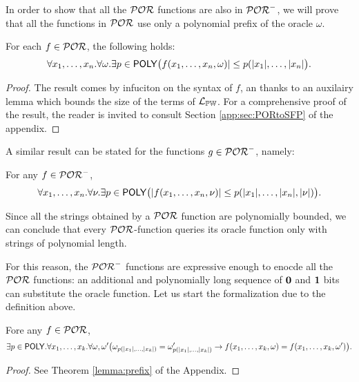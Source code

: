 In order to show that all the $\mathcal{POR}$ functions are also in $\mathcal{POR}^-$, we will prove
that all the functions in $\mathcal{POR}$ use only a polynomial prefix of the oracle $\omega$.

\begin{lemma}\label{main:SFPlemma9}
{For each $f\in \mathcal{POR}$, the following holds:
$$
\forall x_1,\dots,x_n.\forall \omega.\exists p\in \mathsf{POLY}
\big(f(x_1,\dots, x_n,\omega)| \leq p(|x_1|,\dots, |x_n|\big).
$$}
\end{lemma}
\begin{proof}
The result comes by infuciton on the syntax of $f$, an thanks to an auxilairy lemma which bounds the size of the terms of $\mathcal{L}_{\mathbb{PW}}$. For a comprehensive proof of the result, the reader is invited to consult Section \ref{app:sec:PORtoSFP} of the appendix.
\end{proof}

A similar result can be stated for the functions $g \in \mathcal{POR}^-$, namely:

\begin{lemma}
For any $f\in \mathcal{POR}^-$,
$$
\forall x_1,\dots, x_n.\forall \nu.\exists p\in \mathsf{POLY}
\big(|f(x_1,\dots, x_n,\nu)| \leq p(|x_1|,\dots, |x_n|, |\nu|)\big).
$$
\end{lemma}

Since all the strings obtained by a $\mathcal{POR}$ function
are polynomially bounded, we can conclude that every
$\mathcal{POR}$-function queries its
oracle function only with
strings of polynomial length.

For this reason, the $\mathcal{POR}^-$ functions are expressive enough
to enocde all the $\mathcal{POR}$ functions: an additional and polynomially
long sequence of {$\mathbf{0}$} and
{$\mathbf{1}$} bits can substitute the oracle function.
Let us start the formalization
due to the definition above.

\begin{lemma}[Prefix] \label{main:lemma:prefix}
Fore any $f\in \mathcal{POR}$,
\footnotesize
$$
\exists p \in \mathsf{POLY}. \forall x_1,\dots, x_k.
\forall \omega, \omega'\big(
\omega_{p(|x_1|,\dots, |x_k|)}=
\omega'_{p(|x_1|,\dots, |x_k|)}
\rightarrow f(x_1,\dots, x_k,\omega)
=f(x_1,\dots, x_k,\omega')\big).
$$
\end{lemma}
\begin{proof}
See Theorem \ref{lemma:prefix} of the Appendix.
\end{proof}

